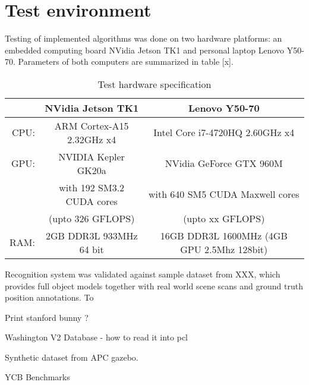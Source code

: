 
\section{Test environment}
\label{sec:testhardware}




Testing of implemented algorithms was done on two hardware platforms: an embedded computing board NVidia Jetson TK1 and personal laptop Lenovo Y50-70. Parameters of both computers are summarized in table [x]. 

\begin{table}[H]
\centering
\begin{tabular}{r c | c}
& NVidia Jetson TK1 & Lenovo Y50-70 \\ 
 \hline
 CPU:& ARM Cortex-A15 2.32GHz x4 & Intel Core i7-4720HQ 2.60GHz x4\\
 GPU:& NVIDIA Kepler GK20a & NVidia GeForce GTX 960M \\
 &with 192 SM3.2 CUDA cores& with 640 SM5 CUDA Maxwell cores\\
 &(upto 326 GFLOPS)&(upto xx GFLOPS)\\
 RAM:& 2GB DDR3L 933MHz 64 bit&  16GB DDR3L 1600MHz (4GB GPU 2.5Mhz 128bit)
\end{tabular}
\caption{Test hardware specification}
\label{tab:hardware}
\end{table}

Recognition system was validated against sample dataset from XXX, which provides full object models together with real world scene scans and ground truth position annotations. To 


Print stanford bunny ?

Washington V2 Database - how to read it into pcl

Synthetic dataset from APC gazebo.


YCB Benchmarks 

